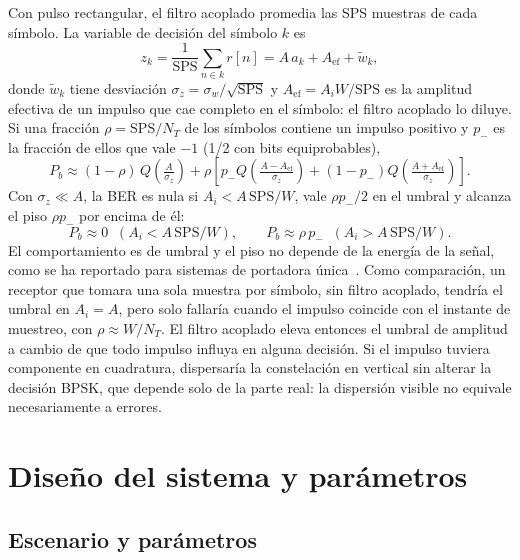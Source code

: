 Con pulso rectangular, el filtro acoplado promedia las SPS muestras de cada
símbolo. La variable de decisión del símbolo $k$ es
\begin{equation}
  z_k=\frac{1}{\mathrm{SPS}}\sum_{n\in k} r[n] = A\,a_k + A_{\mathrm{ef}} + \tilde{w}_k,
  \label{eq:zk}
\end{equation}
donde $\tilde{w}_k$ tiene desviación $\sigma_z=\sigma_w/\sqrt{\mathrm{SPS}}$ y
$A_{\mathrm{ef}}=A_iW/\mathrm{SPS}$ es la amplitud efectiva de un impulso que cae
completo en el símbolo: el filtro acoplado lo diluye. Si una fracción
$\rho=\mathrm{SPS}/N_T$ de los símbolos contiene un impulso positivo y $p_-$ es la
fracción de ellos que vale $-1$ (1/2 con bits equiprobables),
\begin{equation}
  P_b\approx(1-\rho)\,Q\!\left(\tfrac{A}{\sigma_z}\right)
  +\rho\left[p_-Q\!\left(\tfrac{A-A_{\mathrm{ef}}}{\sigma_z}\right)
  +(1-p_-)Q\!\left(\tfrac{A+A_{\mathrm{ef}}}{\sigma_z}\right)\right].
  \label{eq:pb_imp}
\end{equation}
Con $\sigma_z\ll A$, la BER es nula si $A_i<A\,\mathrm{SPS}/W$, vale
$\rho p_-/2$ en el umbral y alcanza el piso $\rho p_-$ por encima de él:
\begin{equation}
  P_b\approx 0 \;\;(A_i<A\,\mathrm{SPS}/W),\qquad
  P_b\approx\rho\,p_- \;\;(A_i>A\,\mathrm{SPS}/W).
  \label{eq:pb_limite}
\end{equation}
El comportamiento es de umbral y el piso no depende de la energía de la señal,
como se ha reportado para sistemas de portadora única~\cite{ghosh1996}. Como
comparación, un receptor que tomara una sola muestra por símbolo, sin filtro
acoplado, tendría el umbral en $A_i=A$, pero solo fallaría cuando el impulso
coincide con el instante de muestreo, con $\rho\approx W/N_T$. El filtro acoplado
eleva entonces el umbral de amplitud a cambio de que todo impulso influya en
alguna decisión. Si el impulso tuviera componente en cuadratura, dispersaría la
constelación en vertical sin alterar la decisión BPSK, que depende solo de la
parte real: la dispersión visible no equivale necesariamente a errores.

\section{Diseño del sistema y parámetros}\label{sec:diseno}

\subsection{Escenario y parámetros}\label{subsec:escenario}

